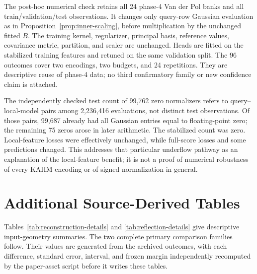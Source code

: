The post-hoc numerical check retains all 24 phase-4 Van der Pol
banks and all train/validation/test observations. It changes only
query-row Gaussian evaluation as in Proposition~\ref{prop:inner-scaling},
before multiplication by the unchanged fitted $B$. The training
kernel, regularizer, principal basis, reference values, covariance
metric, partition, and scaler are unchanged. Heads are fitted on the
stabilized training features and retuned on the same validation split.
The 96 outcomes cover two encodings, two budgets, and 24 repetitions.
They are descriptive reuse of phase-4 data; no third confirmatory
family or new confidence claim is attached.

The independently checked test count of 99,762 zero normalizers refers
to query--local-model pairs among 2,236,416 evaluations, not distinct
test observations. Of those pairs, 99,687 already had all Gaussian
entries equal to floating-point zero; the remaining 75 zeros arose
in later arithmetic. The stabilized count was zero. Local-feature
losses were effectively unchanged, while full-score losses and some
predictions changed. This addresses that particular underflow pathway
as an explanation of the local-feature benefit; it is not a proof of
numerical robustness of every KAHM encoding or of signed normalization
in general.



\clearpage
\section{Additional Source-Derived Tables}\label{app:tables}

Tables~\ref{tab:reconstruction-details} and
\ref{tab:reflection-details} give descriptive input-geometry summaries.
The two complete primary comparison families follow. Their values
are generated from the archived outcomes, with each difference,
standard error, interval, and frozen margin independently recomputed
by the paper-asset script before it writes these tables.

\begin{table}[!htbp]
 \caption{Held-out reconstruction errors per standardized input coordinate,
 averaged over the three blocks and 24 full repetitions. ``Best'' takes
 the best local reconstruction separately in each block; ``weighted''
 averages the individual squared errors with that method's affinities.
 The affine value is lower in all 24 repetitions of each of these five
 input settings, for both summaries. These are descriptive diagnostics,
 not the supervised primary endpoint.}
 \label{tab:reconstruction-details}
 \centering\small\setlength{\tabcolsep}{4pt}
 
\end{table}


